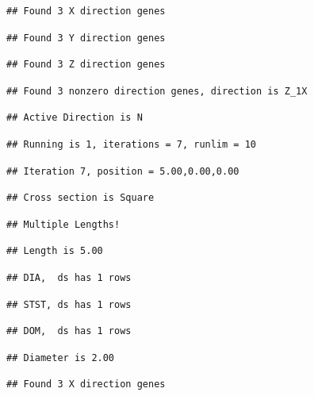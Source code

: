 \documentclass[]{article}
\begin{document}
\begin{verbatim}
## Found 3 X direction genes
\end{verbatim}

\begin{verbatim}
## Found 3 Y direction genes
\end{verbatim}

\begin{verbatim}
## Found 3 Z direction genes
\end{verbatim}

\begin{verbatim}
## Found 3 nonzero direction genes, direction is Z_1X
\end{verbatim}

\begin{verbatim}
## Active Direction is N
\end{verbatim}

\begin{verbatim}
## Running is 1, iterations = 7, runlim = 10
\end{verbatim}

\begin{verbatim}
## Iteration 7, position = 5.00,0.00,0.00
\end{verbatim}

\begin{verbatim}
## Cross section is Square
\end{verbatim}

\begin{verbatim}
## Multiple Lengths!
\end{verbatim}

\begin{verbatim}
## Length is 5.00
\end{verbatim}

\begin{verbatim}
## DIA,  ds has 1 rows
\end{verbatim}

\begin{verbatim}
## STST, ds has 1 rows
\end{verbatim}

\begin{verbatim}
## DOM,  ds has 1 rows
\end{verbatim}

\begin{verbatim}
## Diameter is 2.00
\end{verbatim}

\begin{verbatim}
## Found 3 X direction genes
\end{verbatim}
\end{document}
